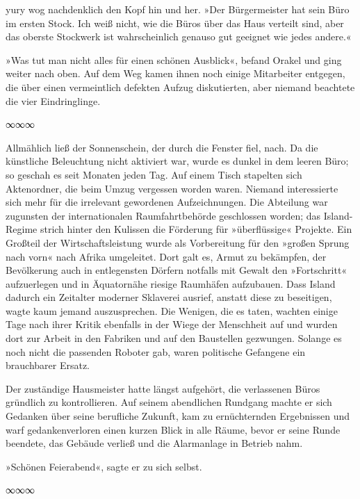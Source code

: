 yury wog nachdenklich den Kopf hin und her. »Der Bürgermeister hat sein Büro im ersten Stock. Ich weiß nicht, wie die Büros über das Haus verteilt sind, aber das oberste Stockwerk ist wahrscheinlich genauso gut geeignet wie jedes andere.«

»Was tut man nicht alles für einen schönen Ausblick«, befand Orakel und ging weiter nach oben. Auf dem Weg kamen ihnen noch einige Mitarbeiter entgegen, die über einen vermeintlich defekten Aufzug diskutierten, aber niemand beachtete die vier Eindringlinge.

\begin{center}
	∞∞∞
\end{center}

Allmählich ließ der Sonnenschein, der durch die Fenster fiel, nach. Da die künstliche Beleuchtung nicht aktiviert war, wurde es dunkel in dem leeren Büro; so geschah es seit Monaten jeden Tag. Auf einem Tisch stapelten sich Aktenordner, die beim Umzug vergessen worden waren. Niemand interessierte sich mehr für die irrelevant gewordenen Aufzeichnungen. Die Abteilung war zugunsten der internationalen Raumfahrtbehörde geschlossen worden; das Island-Regime strich hinter den Kulissen die Förderung für »überflüssige« Projekte. Ein Großteil der Wirtschaftsleistung wurde als Vorbereitung für den »großen Sprung nach vorn« nach Afrika umgeleitet. Dort galt es, Armut zu bekämpfen, der Bevölkerung auch in entlegensten Dörfern notfalls mit Gewalt den »Fortschritt« aufzuerlegen und in Äquatornähe riesige Raumhäfen aufzubauen. Dass Island dadurch ein Zeitalter moderner Sklaverei ausrief, anstatt diese zu beseitigen, wagte kaum jemand auszusprechen. Die Wenigen, die es taten, wachten einige Tage nach ihrer Kritik ebenfalls in der Wiege der Menschheit auf und wurden dort zur Arbeit in den Fabriken und auf den Baustellen gezwungen. Solange es noch nicht die passenden Roboter gab, waren politische Gefangene ein brauchbarer Ersatz.

Der zuständige Hausmeister hatte längst aufgehört, die verlassenen Büros gründlich zu kontrollieren. Auf seinem abendlichen Rundgang machte er sich Gedanken über seine berufliche Zukunft, kam zu ernüchternden Ergebnissen und warf gedankenverloren einen kurzen Blick in alle Räume, bevor er seine Runde beendete, das Gebäude verließ und die Alarmanlage in Betrieb nahm.

»Schönen Feierabend«, sagte er zu sich selbst.

\begin{center}
	∞∞∞
\end{center}

